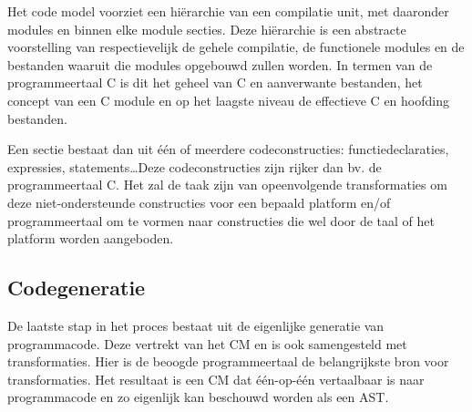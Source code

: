 Het code model voorziet een hi\"erarchie van een compilatie unit, met daaronder
modules en binnen elke module secties. Deze hi\"erarchie is een abstracte
voorstelling van respectievelijk de gehele compilatie, de functionele modules
en de bestanden waaruit die modules opgebouwd zullen worden. In termen van de
programmeertaal C is dit het geheel van C en aanverwante bestanden, het concept
van een C module en op het laagste niveau de effectieve C en hoofding bestanden.

Een sectie bestaat dan uit \'e\'en of meerdere codeconstructies:
functiedeclaraties, expressies, statements\dots Deze codeconstructies zijn
rijker dan bv. de programmeertaal C. Het zal de taak zijn van opeenvolgende
transformaties om deze niet-ondersteunde constructies voor een bepaald platform
en/of programmeertaal om te vormen naar constructies die wel door de taal of
het platform worden aangeboden.

\subsection{Codegeneratie}

De laatste stap in het proces bestaat uit de eigenlijke generatie van
programmacode. Deze vertrekt van het CM en is ook samengesteld met
transformaties. Hier is de beoogde programmeertaal de belangrijkste bron voor
transformaties. Het resultaat is een CM dat \'e\'en-op-\'e\'en vertaalbaar is
naar programmacode en zo eigenlijk kan beschouwd worden als een AST.
